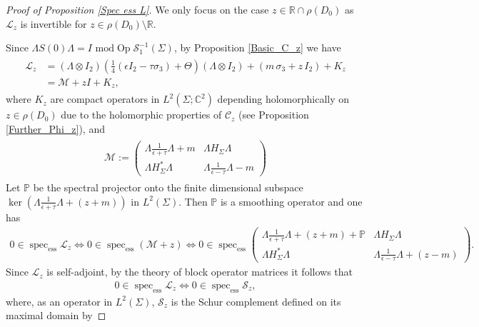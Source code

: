 \documentclass[11pt,a4paper,reqno,oneside]{amsproc}
\DeclareMathOperator{\spec}{spec}
\DeclareMathOperator{\Op}{Op}
\newcommand{\spece}{\spec_\mathrm{ess}}
\newcommand{\cS}{\mathcal{S}}
\def \rr {{\mathbb R}}
\def \cc {{\mathbb C}}
\numberwithin{equation}{section}
\def \cc {{\mathbb{C}}}
\begin{document}
\begin{proof}[Proof of Proposition \ref{Spec ess L}] We only focus on the case $z\in \rr\cap \rho(D_0)$ as $\mathcal L_z$ is invertible for $z\in \rho(D_0)\setminus \rr$. 

Since $\Lambda S(0) \Lambda= I \,\, \mathrm{mod }  \Op \cS^{-1}_1(\Sigma)$, by Proposition \ref{Basic_C_z}  we have 
\begin{align}\label{L decomposition}
\begin{split}
\mathcal L_z&= (\Lambda \otimes I_2)( \frac{1}{4}(\epsilon I_2-\tau\sigma_3)+ \Theta )(\Lambda \otimes I_2) +(m\,\sigma_3 + z\,I_2) +K_z\\
&=\mathcal M + z I +K_z,
\end{split}
\end{align}
where $K_z$  are compact operators in $L^2(\Sigma;\cc^2)$ depending holomorphically on $z\in\rho(D_0)$ due to the holomorphic properties of $\mathscr C_z$ (see Proposition \ref{Further_Phi_z}), and 
\begin{align*}
\begin{split}
\mathcal M :=\begin{pmatrix}
\Lambda\frac{1}{\epsilon+\tau}\Lambda +m &\Lambda H_\Sigma\Lambda  \\
\Lambda H_\Sigma^\ast \Lambda  & \Lambda \frac{1}{\epsilon-\tau}\Lambda -m
\end{pmatrix} 
\end{split}
\end{align*}
Let $\mathbb P$ be the spectral projector onto the finite dimensional subspace $\ker (\Lambda\frac{1}{\epsilon+\tau}\Lambda +(z+m) )$ in $L^2(\Sigma)$. Then $\mathbb P$ is a smoothing operator and one has
\begin{align*}
		0\in \spece \mathcal L_z \Leftrightarrow 0\in \spece (\mathcal M+z) \Leftrightarrow
		0\in\spece \begin{pmatrix}
\Lambda\frac{1}{\epsilon+\tau}\Lambda +(z+m) + \mathbb P &\Lambda H_\Sigma\Lambda  \\
\Lambda H_\Sigma^\ast \Lambda  & \Lambda \frac{1}{\epsilon-\tau}\Lambda +(z-m)
\end{pmatrix}.
		\end{align*}
Since $\mathcal L_z$ is self-adjoint, by the theory of block operator matrices \cite[Thm.~2.4.6]{tretter} it follows that 
\begin{align*}
			0\in \spece \mathcal L_z \Leftrightarrow  0\in \spece \mathcal S_z,
\end{align*}
where, as an operator in $L^2(\Sigma)$,  $\mathcal S_z$ is the Schur complement defined on its maximal domain by

\end{proof}
\end{document}
